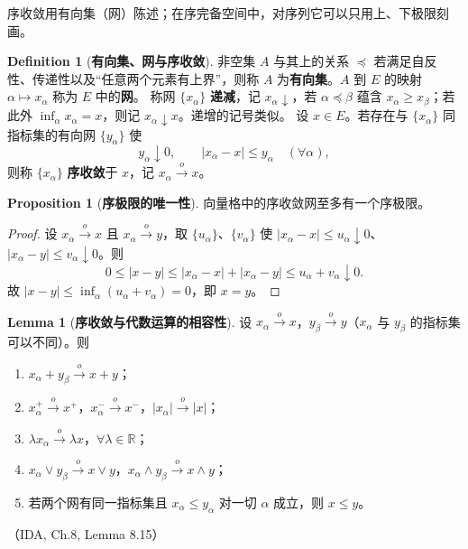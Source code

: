 \documentclass[oneside]{book}
\theoremstyle{definition}
\newcommand{\R}{\mathbb{R}}
\theoremstyle{definition}
\newtheorem{proposition}{Proposition}[section]
\newtheorem{definition}{Definition}[section]
\newtheorem{lemma}{Lemma}[section]
\begin{document}
	序收敛用有向集（网）陈述；在序完备空间中，对序列它可以只用上、下极限刻画。
	
	\begin{definition}[\bfseries{有向集、网与序收敛}]
		非空集 $A$ 与其上的关系 $\preceq$ 若满足自反性、传递性以及“任意两个元素有上界”，则称 $A$ 为\textbf{有向集}。$A$ 到 $E$ 的映射 $\alpha\mapsto x_{\alpha}$ 称为 $E$ 中的\textbf{网}。
		称网 $\{x_{\alpha}\}$ \textbf{递减}，记 $x_{\alpha}\downarrow$，若 $\alpha\preceq\beta$ 蕴含 $x_{\alpha}\geqslant x_{\beta}$；若此外 $\inf_{\alpha}x_{\alpha}=x$，则记 $x_{\alpha}\downarrow x$。递增的记号类似。
		设 $x\in E$。若存在与 $\{x_{\alpha}\}$ 同指标集的有向网 $\{y_{\alpha}\}$ 使
		\[
		y_{\alpha}\downarrow0,\qquad |x_{\alpha}-x|\leqslant y_{\alpha}\quad(\forall\alpha),
		\]
		则称 $\{x_{\alpha}\}$ \textbf{序收敛}于 $x$，记 $x_{\alpha}\xrightarrow{\,o\,}x$。
	\end{definition}
	
	\begin{proposition}[\bfseries{序极限的唯一性}]
		向量格中的序收敛网至多有一个序极限。
	\end{proposition}
	
	\begin{proof}
		设 $x_{\alpha}\xrightarrow{\,o\,}x$ 且 $x_{\alpha}\xrightarrow{\,o\,}y$，取 $\{u_{\alpha}\}$、$\{v_{\alpha}\}$ 使 $|x_{\alpha}-x|\leqslant u_{\alpha}\downarrow0$、$|x_{\alpha}-y|\leqslant v_{\alpha}\downarrow0$。则
		\[
		0\leqslant|x-y|\leqslant|x_{\alpha}-x|+|x_{\alpha}-y|\leqslant u_{\alpha}+v_{\alpha}\downarrow0 .
		\]
		故 $|x-y|\leqslant\inf_{\alpha}(u_{\alpha}+v_{\alpha})=0$，即 $x=y$。
	\end{proof}
	
	\begin{lemma}[\bfseries{序收敛与代数运算的相容性}]
		设 $x_{\alpha}\xrightarrow{\,o\,}x$，$y_{\beta}\xrightarrow{\,o\,}y$（$x_{\alpha}$ 与 $y_{\beta}$ 的指标集可以不同）。则
		\begin{enumerate}[label=(\arabic*),leftmargin=2.2em,itemsep=0.1em,topsep=0.3em]
			\item $x_{\alpha}+y_{\beta}\xrightarrow{\,o\,}x+y$；
			\item $x_{\alpha}^{+}\xrightarrow{\,o\,}x^{+}$，$x_{\alpha}^{-}\xrightarrow{\,o\,}x^{-}$，$|x_{\alpha}|\xrightarrow{\,o\,}|x|$；
			\item $\lambda x_{\alpha}\xrightarrow{\,o\,}\lambda x$，$\forall\lambda\in\R$；
			\item $x_{\alpha}\vee y_{\beta}\xrightarrow{\,o\,}x\vee y$，$x_{\alpha}\wedge y_{\beta}\xrightarrow{\,o\,}x\wedge y$；
			\item 若两个网有同一指标集且 $x_{\alpha}\leqslant y_{\alpha}$ 对一切 $\alpha$ 成立，则 $x\leqslant y$。
		\end{enumerate}
		（IDA, Ch.8, Lemma 8.15）
	\end{lemma}
	
\end{document}
